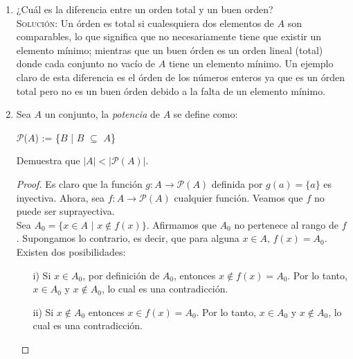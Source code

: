 \documentclass[letterpaper,11pt]{article}
\begin{document}
\begin{enumerate}
\begin{itemize}
        \end{itemize}
        
        \item ¿Cuál es la diferencia entre un orden total y un buen orden? \\
        \textsc{Solución:} Un órden es total si cualesquiera dos elementos de
        $A$ son comparables, lo que significa que no necesariamente tiene que
        existir un elemento mínimo; mientras que un buen órden es un orden
        lineal (total) donde cada conjunto no vacío de $A$ tiene un elemento
        mínimo. Un ejemplo claro de esta diferencia es el órden de los números
        enteros ya que es un órden total pero no es un buen órden debido a la
        falta de un elemento mínimo.
        
        \item Sea $A$ un conjunto, la \textit{potencia} de $A$ se define como:
        
        \begin{center}
            $\mathcal{P}$($A$) := \{$B$ | $B$ $\subseteq$ $A$\}
        \end{center}
        
        Demuestra que $|A| < |\mathcal{P}(A)|$.
        
        \begin{proof}
            Es claro que la función $g: A \longrightarrow \mathcal{P}(A)$
            definida por $g(a) = \{a\}$ es inyectiva. Ahora, sea
            $f: A \longrightarrow \mathcal{P}(A)$ cualquier función. Veamos que 
            $f$ no puede ser suprayectiva. \\
            Sea $A_{0} = \{x \in A$ $|$ $x \notin f(x)\}$. Afirmamos que $A_{0}$
            no pertenece al rango de $f$. Supongamos lo contrario, es decir,
            que para alguna $x \in A$, $f(x) = A_{0}$. Existen dos
            posibilidades:
            
            \begin{itemize}
                
                \item[i)] Si $x \in A_{0}$, por definición de $A_{0}$, entonces
                $x \notin f(x) = A_{0}$. Por lo tanto, $x \in A_{0}$ y 
                $x \notin A_{0}$, lo cual es una contradicción.
                
                \item[ii)] Si $x \notin A_{0}$ entonces $x \in f(x) = A_{0}$.
                Por lo tanto, $x \in A_{0}$ y $x \notin A_{0}$, lo cual es una
                contradicción.
            \end{itemize}
            

\end{proof}
\end{enumerate}
\end{document}
